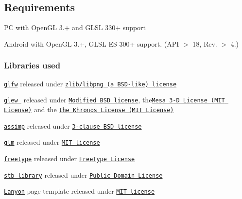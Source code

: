 \subsection*{{\bfseries Requirements}}


\begin{DoxyItemize}
\item PC with Open\+GL 3.+ and G\+L\+SL 330+ support
\item Android with Open\+GL 3.+, G\+L\+SL ES 300+ support. (A\+PI $>$ 18, Rev. $>$ 4.)
\end{DoxyItemize}

\subsubsection*{{\bfseries Libraries used}}


\begin{DoxyItemize}
\item \href{http://www.glfw.org}{\tt glfw} released under \href{v}{\tt zlib/libpng (a B\+S\+D-\/like) license} 
\item \href{https://github.com/omniavinco/glew-cmake}{\tt glew } released under \href{http://glew.sourceforge.net/glew.txt}{\tt Modified B\+SD license}, the\href{http://glew.sourceforge.net/mesa.txt}{\tt Mesa 3-\/D License (M\+IT License)} and the \href{http://glew.sourceforge.net/khronos.txt}{\tt the Khronos License (M\+IT License)} 
\item \href{http://assimp.sourceforge.net/}{\tt assimp} released under \href{http://assimp.sourceforge.net/main_license.html}{\tt 3-\/clause B\+SD license} 
\item \href{http://glm.g-truc.net}{\tt glm} released under \href{http://glm.g-truc.net/copying.txt}{\tt M\+IT license}  
\item \href{http://www.freetype.org}{\tt freetype} released under \href{http://git.savannah.gnu.org/cgit/freetype/freetype2.git/tree/docs/FTL.TXT}{\tt Free\+Type License} 
\item \href{https://github.com/nothings/stb}{\tt stb library} released under \href{https://github.com/nothings/stb/blob/master/README.md#whats-the-license}{\tt Public Domain License} 
\item \href{https://github.com/poole/lanyon}{\tt Lanyon} page template released under \href{https://github.com/poole/lanyon/blob/master/LICENSE.md}{\tt M\+IT license} 
\end{DoxyItemize}